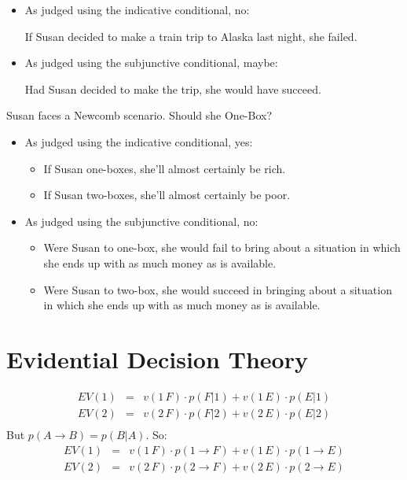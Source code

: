 \documentclass[12pt]{extarticle}
\begin{document}
\begin{itemize}
\item As judged using the indicative conditional, no:

If Susan decided to make a train trip to Alaska last night, she failed.


\item As judged using the subjunctive conditional, maybe:

Had Susan decided to make the trip, she would have succeed.

\end{itemize}
Susan faces a Newcomb scenario. Should she One-Box?
\begin{itemize}
\item As judged using the indicative conditional, yes:

\begin{itemize}

\item If Susan one-boxes, she'll almost certainly be rich. 
\item If Susan two-boxes, she'll almost certainly be poor. 

\end{itemize}
\item As judged using the subjunctive conditional, no:

\begin{itemize}

\item
Were Susan to one-box, she would fail to bring about a situation in which she ends up with as much money as is available.

\item
Were Susan to two-box, she would succeed in bringing about a situation in which she ends up with as much money as is available.

\end{itemize}

\end{itemize}

\section{Evidential Decision Theory}

\[
\begin{array}{ccc}
EV(1) &= &v(1\, F) \cdot p(F|1) + v(1\,E) \cdot p(E|1)\\
EV(2) &= &v(2\, F) \cdot p(F|2) + v(2\,E) \cdot p(E|2)\\
\end{array}
\]
But $p(A \rightarrow B) = p(B|A)$. So:
\[
\begin{array}{ccc}
EV(1) &= &v(1\, F) \cdot p(1 \rightarrow F) + v(1\,E) \cdot p(1\rightarrow E)\\
EV(2) &= &v(2\, F) \cdot p(2 \rightarrow F) + v(2\,E) \cdot p(2 \rightarrow E)
\end{array}
\]
\end{document}
